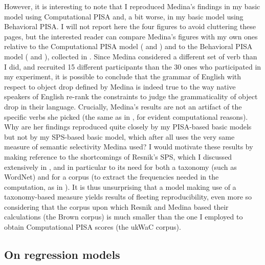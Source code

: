 However, it is interesting to note that I reproduced Medina's findings in my basic model using Computational PISA and, a bit worse, in my basic model using Behavioral PISA. I will not report here the four figures to avoid cluttering these pages, but the interested reader can compare Medina's figures with my own ones relative to the Computational PISA model ( and ) and to the Behavioral PISA model ( and ), collected in . Since Medina considered a different set of verb than I did, and recruited 15 different participants than the 30 ones who participated in my experiment, it is possible to conclude that the grammar of English with respect to object drop defined by Medina is indeed true to the way native speakers of English re-rank the constraints to judge the grammaticality of object drop in their language. Crucially, Medina's results are not an artifact of the specific verbs she picked (the same as in \textcite{Resnik1993, Resnik1996}, for evident computational reasons). Why are her findings reproduced quite closely by my PISA-based basic models but not by my SPS-based basic model, which after all uses the very same measure of semantic selectivity Medina used? I would motivate these results by making reference to the shortcomings of Resnik's SPS, which I discussed extensively in , and in particular to its need for both a taxonomy (such as WordNet) and for a corpus (to extract the frequencies needed in the computation, as in ). It is thus unsurprising that a model making use of a taxonomy-based measure yields results of fleeting reproducibility, even more so considering that the corpus upon which Resnik and Medina based their calculations (the Brown corpus) is much smaller than the one I employed to obtain Computational PISA scores (the ukWaC corpus).


\subsection{On regression models} 

